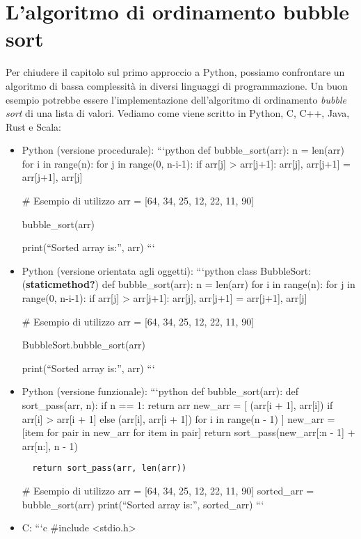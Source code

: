 \documentclass[
  letterpaper,
]{scrbook}
\begin{document}
\section{L'algoritmo di ordinamento bubble
sort}\label{lalgoritmo-di-ordinamento-bubble-sort}

Per chiudere il capitolo sul primo approccio a Python, possiamo
confrontare un algoritmo di bassa complessità in diversi linguaggi di
programmazione. Un buon esempio potrebbe essere l'implementazione
dell'algoritmo di ordinamento \emph{bubble sort} di una lista di valori.
Vediamo come viene scritto in Python, C, C++, Java, Rust e Scala:

\begin{itemize}
\item
  Python (versione procedurale): ```python def bubble\_sort(arr): n =
  len(arr) for i in range(n): for j in range(0, n-i-1): if arr{[}j{]}
  \textgreater{} arr{[}j+1{]}: arr{[}j{]}, arr{[}j+1{]} = arr{[}j+1{]},
  arr{[}j{]}

  \# Esempio di utilizzo arr = {[}64, 34, 25, 12, 22, 11, 90{]}

  bubble\_sort(arr)

  print(``Sorted array is:'', arr) ```
\item
  Python (versione orientata agli oggetti): ```python class BubbleSort:
  (\textbf{staticmethod?}) def bubble\_sort(arr): n = len(arr) for i in
  range(n): for j in range(0, n-i-1): if arr{[}j{]} \textgreater{}
  arr{[}j+1{]}: arr{[}j{]}, arr{[}j+1{]} = arr{[}j+1{]}, arr{[}j{]}

  \# Esempio di utilizzo arr = {[}64, 34, 25, 12, 22, 11, 90{]}

  BubbleSort.bubble\_sort(arr)

  print(``Sorted array is:'', arr) ```
\item
  Python (versione funzionale): ```python def bubble\_sort(arr): def
  sort\_pass(arr, n): if n == 1: return arr new\_arr = {[} (arr{[}i +
  1{]}, arr{[}i{]}) if arr{[}i{]} \textgreater{} arr{[}i + 1{]} else
  (arr{[}i{]}, arr{[}i + 1{]}) for i in range(n - 1) {]} new\_arr =
  {[}item for pair in new\_arr for item in pair{]} return
  sort\_pass(new\_arr{[}:n - 1{]} + arr{[}n:{]}, n - 1)

\begin{verbatim}
  return sort_pass(arr, len(arr))
\end{verbatim}

  \# Esempio di utilizzo arr = {[}64, 34, 25, 12, 22, 11, 90{]}
  sorted\_arr = bubble\_sort(arr) print(``Sorted array is:'',
  sorted\_arr) ```
\item
  C: ```c \#include \textless stdio.h\textgreater{}


\end{itemize}
\end{document}
